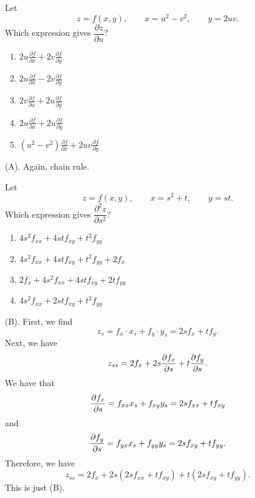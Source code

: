 \begin{exercise}
Let
\[
z=f(x,y),
\qquad
x=u^2-v^2,
\qquad
y=2uv.
\]
Which expression gives $\dfrac{\partial z}{\partial u}$?
\begin{enumerate}[label=(\Alph*)]
    \item
    $2u\frac{\partial f}{\partial x}
    +2v\frac{\partial f}{\partial y}$

    \item
    $2u\frac{\partial f}{\partial x}
    -2v\frac{\partial f}{\partial y}$

    \item
    $2v\frac{\partial f}{\partial x}
    +2u\frac{\partial f}{\partial y}$

    \item
    $2u\frac{\partial f}{\partial x}
    +2u\frac{\partial f}{\partial y}$

    \item
    $(u^2-v^2)\frac{\partial f}{\partial x}
    +2uv\frac{\partial f}{\partial y}$
\end{enumerate}
\end{exercise}
\begin{solution}
(A). Again, chain rule.
\end{solution}

\begin{exercise}
Let
\[
z=f(x,y),
\qquad
x=s^2+t,
\qquad
y=st.
\]
Which expression gives $\dfrac{\partial^2z}{\partial s^2}$?
\begin{enumerate}[label=(\Alph*)]
    \item
    $4s^2f_{xx}+4stf_{xy}+t^2f_{yy}$

    \item
    $4s^2f_{xx}+4stf_{xy}+t^2f_{yy}+2f_x$

    \item
    $2f_x+4s^2f_{xx}+4stf_{xy}+2tf_{yy}$

    \item
    $4s^2f_{xx}+2stf_{xy}+t^2f_{yy}$
\end{enumerate}
\end{exercise}
\begin{solution}
(B). First, we find 
\[
z_s = f_x \cdot x_s + f_y \cdot y_s 
= 2sf_x + tf_y.
\]
Next, we have
\[
z_{ss} = 2f_x + 2s\frac{\partial f_x}{\partial s} + t\frac{\partial f_y}{\partial s}.
\]
We have that 
\[
\frac{\partial f_x}{\partial s} = f_{xx}x_s + f_{xy}y_s
= 2sf_{xx} + tf_{xy}
\]
and
\[
\frac{\partial f_y}{\partial s} = f_{yx}x_s + f_{yy}y_s 
= 2sf_{xy} + tf_{yy}.
\]
Therefore, we have
\[
z_{ss} = 2f_x + 2s(2sf_{xx} + tf_{xy}) + t(2sf_{xy} + tf_{yy}).
\]
This is just (B).
\end{solution}

